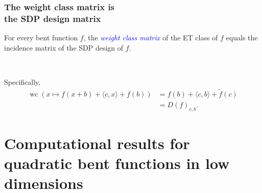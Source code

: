 \documentclass[pdf,sprung,slideColor,nocolorBG]{beamer}
\newenvironment{colortheme}[1]{
\def\ProvidesPackageRCS $##1${\relax}
\renewcommand{\ProcessOptions}{\relax}
\makeatletter

\makeatother
}{}
\newcommand{\Emph}[1]{\emph{\textcolor{blue}{#1}}}
\newcommand{\dual}[1]{\widetilde{#1}}
\newcommand{\weightclass}[1]{\operatorname{wc}\left(#1\right)}
\begin{document}
\begin{colortheme}{jubata}

\begin{frame}
\frametitle{The weight class matrix is \\ the SDP design matrix}
\begin{Theorem}
For every bent function $f$, the \Emph{weight class matrix} of the ET class of $f$
equals the incidence matrix of the SDP design of $f$.

~

Specifically,
\begin{align*}
\weightclass{x \mapsto f(x+b) + \langle c, x \rangle + f(b)}
&=
f(b) + \langle c, b \rangle + \dual{f}(c)
\\
&=
D(f)_{c,b}.
\end{align*}

\end{Theorem}

\end{frame}

\end{colortheme}

\section{Computational results for quadratic bent functions in low dimensions}
\end{document}
